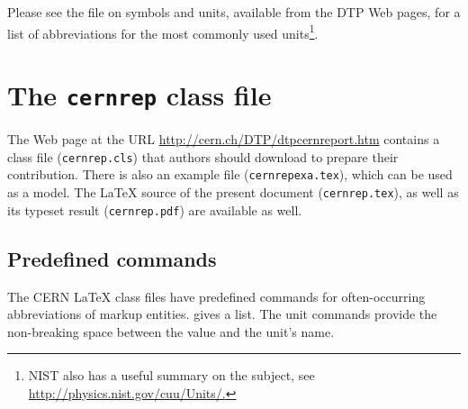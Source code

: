 \documentclass[12pt,twoside,a4paper]{cernrep}
\begin{document}
Please see the file on symbols and units, available from the DTP Web
pages, for a list of abbreviations for the most commonly used
units\footnote{NIST also has a useful summary on the subject, see
\url{http://physics.nist.gov/cuu/Units/.}}.

\newpage
\appendix

\section{The \texttt{cernrep} class file}

The Web page at the URL \url{http://cern.ch/DTP/dtpcernreport.htm}
contains a class file (\texttt{cernrep.cls}) that authors should
download to prepare their contribution. There is also an example file
(\texttt{cernrepexa.tex}), which can be used as a model. The \LaTeX{}
source of the present document (\texttt{cernrep.tex}), as well as its
typeset result (\texttt{cernrep.pdf}) are available as well.

\subsection{Predefined commands}

The CERN \LaTeX{} class files have predefined commands for
often-occurring abbreviations of markup entities. 
gives a list. The unit commands provide the non-breaking space between
the value and the unit's name.
\end{document}
